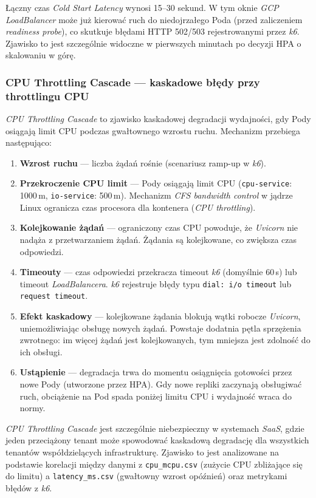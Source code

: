 Łączny czas \textit{Cold Start Latency} wynosi 15--30 sekund. W tym oknie \textit{GCP LoadBalancer} może już kierować ruch do niedojrzałego Poda (przed zaliczeniem \textit{readiness probe}), co skutkuje błędami HTTP 502/503 rejestrowanymi przez \textit{k6}. Zjawisko to jest szczególnie widoczne w pierwszych minutach po decyzji HPA o skalowaniu w górę.

\subsubsection{CPU Throttling Cascade — kaskadowe błędy przy throttlingu CPU}

\textit{CPU Throttling Cascade} to zjawisko kaskadowej degradacji wydajności, gdy Pody osiągają limit CPU podczas gwałtownego wzrostu ruchu. Mechanizm przebiega następująco:

\begin{enumerate}
  \item \textbf{Wzrost ruchu} — liczba żądań rośnie (scenariusz ramp-up w \textit{k6}).
  \item \textbf{Przekroczenie CPU limit} — Pody osiągają limit CPU (\texttt{cpu-service}: 1000\,m, \texttt{io-service}: 500\,m). Mechanizm \textit{CFS bandwidth control} w jądrze Linux ogranicza czas procesora dla kontenera (\textit{CPU throttling}).
  \item \textbf{Kolejkowanie żądań} — ograniczony czas CPU powoduje, że \textit{Uvicorn} nie nadąża z przetwarzaniem żądań. Żądania są kolejkowane, co zwiększa czas odpowiedzi.
  \item \textbf{Timeouty} — czas odpowiedzi przekracza timeout \textit{k6} (domyślnie 60\,s) lub timeout \textit{LoadBalancera}. \textit{k6} rejestruje błędy typu \texttt{dial: i/o timeout} lub \texttt{request timeout}.
  \item \textbf{Efekt kaskadowy} — kolejkowane żądania blokują wątki robocze \textit{Uvicorn}, uniemożliwiając obsługę nowych żądań. Powstaje dodatnia pętla sprzężenia zwrotnego: im więcej żądań jest kolejkowanych, tym mniejsza jest zdolność do ich obsługi.
  \item \textbf{Ustąpienie} — degradacja trwa do momentu osiągnięcia gotowości przez nowe Pody (utworzone przez HPA). Gdy nowe repliki zaczynają obsługiwać ruch, obciążenie na Pod spada poniżej limitu CPU i wydajność wraca do normy.
\end{enumerate}

\textit{CPU Throttling Cascade} jest szczególnie niebezpieczny w systemach \textit{SaaS}, gdzie jeden przeciążony tenant może spowodować kaskadową degradację dla wszystkich tenantów współdzielących infrastrukturę. Zjawisko to jest analizowane na podstawie korelacji między danymi z \texttt{cpu\_mcpu.csv} (zużycie CPU zbliżające się do limitu) a \texttt{latency\_ms.csv} (gwałtowny wzrost opóźnień) oraz metrykami błędów z \textit{k6}.

